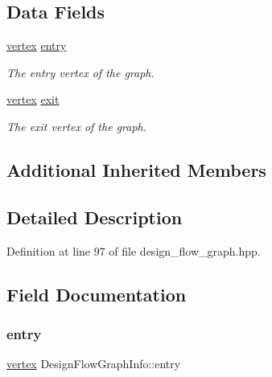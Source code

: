 \subsection*{Data Fields}
\begin{DoxyCompactItemize}
\item 
\hyperlink{graph_8hpp_abefdcf0544e601805af44eca032cca14}{vertex} \hyperlink{structDesignFlowGraphInfo_a53aa2aae48f2278554957074ee9aca54}{entry}
\begin{DoxyCompactList}\small\item\em The entry vertex of the graph. \end{DoxyCompactList}\item 
\hyperlink{graph_8hpp_abefdcf0544e601805af44eca032cca14}{vertex} \hyperlink{structDesignFlowGraphInfo_ae55b80adf8deb7f3c11866c37607b262}{exit}
\begin{DoxyCompactList}\small\item\em The exit vertex of the graph. \end{DoxyCompactList}\end{DoxyCompactItemize}
\subsection*{Additional Inherited Members}


\subsection{Detailed Description}


Definition at line 97 of file design\+\_\+flow\+\_\+graph.\+hpp.



\subsection{Field Documentation}
\mbox{\label{structDesignFlowGraphInfo_a53aa2aae48f2278554957074ee9aca54}} 
\subsubsection{\texorpdfstring{entry}{entry}}
{\footnotesize\ttfamily \hyperlink{graph_8hpp_abefdcf0544e601805af44eca032cca14}{vertex} Design\+Flow\+Graph\+Info\+::entry}



